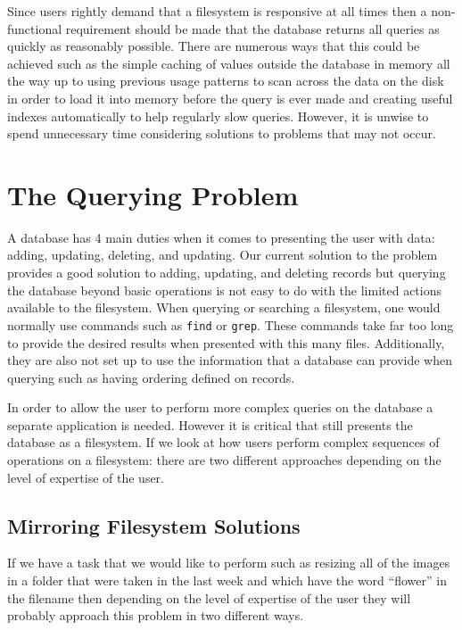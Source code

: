 Since users rightly demand that a filesystem is responsive at all times then
a non-functional requirement should be made that the database returns all
queries as quickly as reasonably possible. There are numerous ways that this
could be achieved such as the simple caching of values outside the database in
memory all the way up to using previous usage patterns to scan across the data
on the disk in order to load it into memory before the query is ever made and
creating useful indexes automatically to help regularly slow queries. However,
it is unwise to spend unnecessary time considering solutions to problems that
may not occur.

\section{The Querying Problem}
\label{sec:queryproblem}

A database has 4 main duties when it comes to presenting the user with data:
adding, updating, deleting, and updating. Our current solution to the problem
provides a good solution to adding, updating, and deleting records but querying
the database beyond basic operations is not easy to do with the limited actions
available to the filesystem. When querying or searching a filesystem, one would
normally use commands such as \texttt{find} or \texttt{grep}. These commands
take far too long to provide the desired results when presented with this many
files. Additionally, they are also not set up to use the information that
a database can provide when querying such as having ordering defined on
records.

In order to allow the user to perform more complex queries on the database
a separate application is needed. However it is critical that still presents
the database as a filesystem. If we look at how users perform complex sequences
of operations on a filesystem: there are two different approaches depending on
the level of expertise of the user.

\subsection{Mirroring Filesystem Solutions}

If we have a task that we would like to perform such as resizing all of the
images in a folder that were taken in the last week and which have the word
``flower'' in the filename then depending on the level of expertise of the user
they will probably approach this problem in two different ways.

